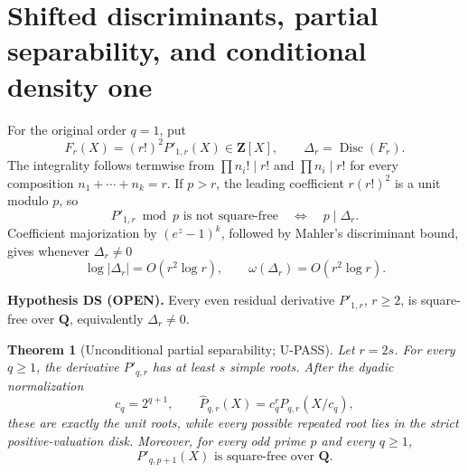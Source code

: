 \documentclass[11pt]{article}
\theoremstyle{keio}
\newtheorem{theorem}{Theorem}[section]
\theoremstyle{keioinput}
\newcommand{\UPASS}{\textcolor{passgreen}{\textsf{U-PASS}}}
\newcommand{\OPEN}{\textcolor{openred}{\textsf{OPEN}}}
\newcommand{\Q}{\mathbf{Q}}
\begin{document}
\section{Shifted discriminants, partial separability, and conditional density one}

For the original order $q=1$, put
\begin{equation}
F_r(X)=(r!)^2P'_{1,r}(X)\in\mathbf Z[X],
\qquad
\Delta_r=\operatorname{Disc}(F_r).
\label{eq:Delta}
\end{equation}
The integrality follows termwise from $\prod n_i!\mid r!$ and
$\prod n_i\mid r!$ for every composition $n_1+\cdots+n_k=r$. If $p>r$,
the leading coefficient $r(r!)^2$ is a unit modulo $p$, so
\begin{equation}
\boxed{
P'_{1,r}\bmod p\text{ is not square-free}
\quad\Longleftrightarrow\quad p\mid\Delta_r.}
\label{eq:Delta-equivalence}
\end{equation}
Coefficient majorization by $(e^z-1)^k$, followed by Mahler's
discriminant bound, gives whenever $\Delta_r\ne0$
\begin{equation}
\log|\Delta_r|=O(r^2\log r),
\qquad
\omega(\Delta_r)=O(r^2\log r).
\label{eq:Delta-bound}
\end{equation}

\begin{notebox}
\textbf{Hypothesis DS (\OPEN).} Every even residual derivative
$P'_{1,r}$, $r\ge2$, is square-free over $\Q$, equivalently
$\Delta_r\ne0$.
\end{notebox}

\begin{theorem}[Unconditional partial separability; \UPASS]\label{thm:partial-sep}
Let $r=2s$. For every $q\ge1$, the derivative $P'_{q,r}$ has at least
$s$ simple roots. After the dyadic normalization
\[
c_q=2^{q+1},\qquad
\widehat P_{q,r}(X)=c_q^rP_{q,r}(X/c_q),
\]
these are exactly the unit roots, while every possible repeated root lies
in the strict positive-valuation disk. Moreover, for every odd prime $p$
and every $q\ge1$,
\begin{equation}
\boxed{P'_{q,p+1}(X)\text{ is square-free over }\Q.}
\label{eq:prime-successor}
\end{equation}
\end{theorem}
\end{document}
